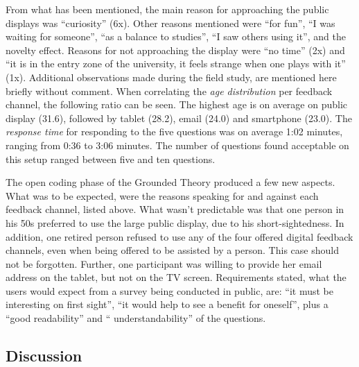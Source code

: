 	From what has been mentioned, the main reason for approaching the public displays was ``curiosity'' (6x). Other reasons mentioned were ``for fun'', ``I was waiting for someone'', ``as a balance to studies'', ``I saw others using it'', and the novelty effect. Reasons for not approaching the display were ``no time'' (2x) and ``it is in the entry zone of the university, it feels strange when one plays with it'' (1x).
	Additional observations made during the field study, are mentioned here briefly without comment.
	When correlating the \textit{age distribution} per feedback channel, the following ratio can be seen. The highest age is on average on public display (31.6), followed by tablet (28.2), email (24.0) and smartphone (23.0).
	The \textit{response time} for responding to the five questions was on average 1:02 minutes, ranging from 0:36 to 3:06 minutes.
	The number of questions found acceptable on this setup ranged between five and ten questions.


	The open coding phase of the Grounded Theory produced a few new aspects. What was to be expected, were the reasons speaking for and against each feedback channel, listed above. What wasn't predictable was that one person in his 50s preferred to use the large public display, due to his short-sightedness. In addition, one retired person refused to use any of the four offered digital feedback channels, even when being offered to be assisted by a person. This case should not be forgotten. Further, one participant was willing to provide her email address on the tablet, but not on the TV screen.
	Requirements stated, what the users would expect from a survey being conducted in public, are: ``it must be interesting on first sight'', ``it would help to see a benefit for oneself'', plus a ``good readability'' and `` understandability'' of the questions.

	








\clearpage
\subsection{Discussion}



